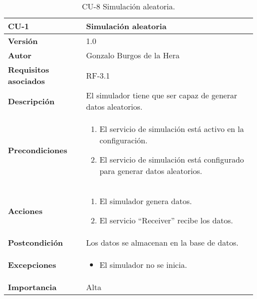 \begin{table}[H]
	\centering
	\begin{tabularx}{\linewidth}{ p{} p{} }
		\toprule
		\textbf{CU-1}    & \textbf{Simulación aleatoria}\\
		\toprule
		\textbf{Versión}              & 1.0    \\
		\textbf{Autor}                & Gonzalo Burgos de la Hera \\
		\textbf{Requisitos asociados} & RF-3.1 \\
		\textbf{Descripción}          & El simulador tiene que ser capaz de generar datos aleatorios.\\
		\textbf{Precondiciones}       & 
        \begin{enumerate}
			\def\labelenumi{\arabic{enumi}.}
			\tightlist
			\item El servicio de simulación está activo en la configuración.
			\item El servicio de simulación está configurado para generar datos aleatorios.
		\end{enumerate}\\
		\textbf{Acciones}             &
		\begin{enumerate}
			\def\labelenumi{\arabic{enumi}.}
			\tightlist
			\item El simulador genera datos.
			\item El servicio ``Receiver'' recibe los datos.
		\end{enumerate}\\
		\textbf{Postcondición}        & Los datos se almacenan en la base de datos. \\
		\textbf{Excepciones}          & 
        \begin{itemize}
			\tightlist
			\item El simulador no se inicia.
        \end{itemize} \\
		\textbf{Importancia}          & Alta \\
		\bottomrule
	\end{tabularx}
	\caption{CU-8 Simulación aleatoria.}
\end{table}

